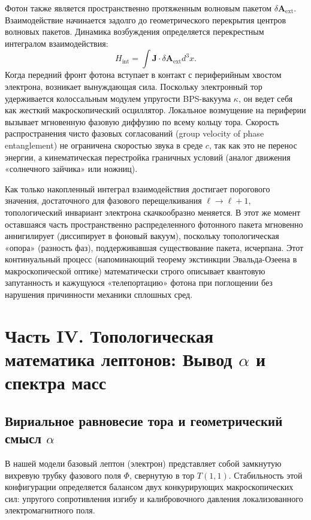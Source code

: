 \documentclass[12pt,a4paper]{article}
\begin{document}
Фотон также является пространственно протяженным волновым пакетом $\delta \mathbf{A}_{\text{ext}}$. Взаимодействие начинается задолго до геометрического перекрытия центров волновых пакетов. Динамика возбуждения определяется перекрестным интегралом взаимодействия:
\begin{equation}
	H_{\text{int}} = \int \mathbf{J} \cdot \delta \mathbf{A}_{\text{ext}} d^3x.
\end{equation}
Когда передний фронт фотона вступает в контакт с периферийным хвостом электрона, возникает вынуждающая сила. Поскольку электронный тор удерживается колоссальным модулем упругости BPS-вакуума $\kappa$, он ведет себя как жесткий макроскопический осциллятор. Локальное возмущение на периферии вызывает мгновенную фазовую диффузию по всему кольцу тора. 
Скорость распространения чисто фазовых согласований (group velocity of phase entanglement) не ограничена скоростью звука в среде $c$, так как это не перенос энергии, а кинематическая перестройка граничных условий (аналог движения «солнечного зайчика» или ножниц). 

Как только накопленный интеграл взаимодействия достигает порогового значения, достаточного для фазового перещелкивания $\ell \to \ell + 1$, топологический инвариант электрона скачкообразно меняется. В этот же момент оставшаяся часть пространственно распределенного фотонного пакета мгновенно аннигилирует (диссипирует в фоновый вакуум), поскольку топологическая «опора» (разность фаз), поддерживавшая существование пакета, исчерпана. 
Этот континуальный процесс (напоминающий теорему экстинкции Эвальда-Озеена в макроскопической оптике) математически строго описывает квантовую запутанность и кажущуюся «телепортацию» фотона при поглощении без нарушения причинности механики сплошных сред.

\section{Часть IV. Топологическая математика лептонов: Вывод $\alpha$ и спектра масс}

\subsection{Вириальное равновесие тора и геометрический смысл $\alpha$}
В нашей модели базовый лептон (электрон) представляет собой замкнутую вихревую трубку фазового поля $\Phi$, свернутую в тор $T(1,1)$. Стабильность этой конфигурации определяется балансом двух конкурирующих макроскопических сил: упругого сопротивления изгибу и калибровочного давления локализованного электромагнитного поля.
\end{document}
